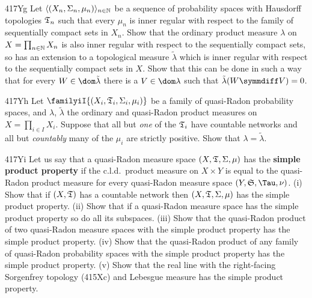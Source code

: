 {\spheader 417Yg Let $\langle(X_n,\Sigma_n,\mu_n)\rangle_{n\in\Bbb N}$ be
a sequence of probability spaces with
Hausdorff topologies $\frak T_n$ such that
every $\mu_n$ is inner regular with respect to the family of
sequentially compact
sets in $X_n$.   Show that the ordinary product measure $\lambda$ on
$X=\prod_{n\in\Bbb N}X_n$ is also inner regular with respect to the
sequentially compact sets, so has an extension to a topological measure
$\tilde\lambda$ which is inner regular with respect to the sequentially
compact sets in $X$.   Show that this can be done in such a way that for
every $W\in\dom\tilde\lambda$ there is a $V\in\dom\lambda$ such that
$\tilde\lambda(W\symmdiff V)=0$.

\spheader 417Yh Let $\familyiI{(X_i,\frak T_i,\Sigma_i,\mu_i)}$ be a
family of quasi-Radon probability spaces, and $\lambda$,
$\tilde\lambda$ the ordinary and quasi-Radon product measures on
$X=\prod_{i\in I}X_i$.   Suppose that all but {\it one} of the
$\frak T_i$ have countable networks and all but {\it countably} many of
the $\mu_i$ are strictly positive.   Show that $\lambda=\tilde\lambda$.

\spheader 417Yi Let us say that a quasi-Radon measure space
$(X,\frak T,\Sigma,\mu)$ has the {\bf simple product property} if the
c.l.d.\ product measure on $X\times Y$ is equal to the quasi-Radon
product measure for every quasi-Radon measure space
$(Y,\frak S,\Tau,\nu)$.
(i) Show that if $(X,\frak T)$ has a countable network then
$(X,\frak T,\Sigma,\mu)$ has the simple product property.   (ii) Show
that if a quasi-Radon measure space has the simple product property so
do all its subspaces.  (iii) Show that the quasi-Radon product of two
quasi-Radon measure spaces with the simple product property has the
simple product property.   (iv) Show that the quasi-Radon product of any
family of quasi-Radon probability spaces with the simple product
property has the simple product property.   (v) Show that the real line
with the right-facing Sorgenfrey topology (415Xc) and Lebesgue measure
has the simple product property.
}%

